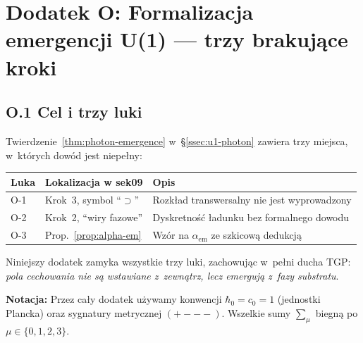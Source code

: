 %
%

\section*{Dodatek O: Formalizacja emergencji U(1) — trzy brakujące kroki}
\label{app:u1_formal}

\subsection*{O.1 Cel i trzy luki}

Twierdzenie~\ref{thm:photon-emergence} w~\S\ref{ssec:u1-photon}
zawiera trzy miejsca, w~których dowód jest niepełny:

\begin{center}
\begin{tabular}{lll}
\toprule
Luka & Lokalizacja w sek09 & Opis \\
\midrule
O-1 & Krok~3, symbol ``$\supset$'' & Rozkład transwersalny nie jest wyprowadzony \\
O-2 & Krok~2, ``wiry fazowe'' & Dyskretność ładunku bez formalnego dowodu \\
O-3 & Prop.~\ref{prop:alpha-em} & Wzór na $\alpha_\mathrm{em}$ ze szkicową dedukcją \\
\bottomrule
\end{tabular}
\end{center}

\noindent
Niniejszy dodatek zamyka wszystkie trzy luki, zachowując w~pełni
ducha TGP: \emph{pola cechowania nie są wstawiane z~zewnątrz,
lecz emergują z~fazy substratu}.

\medskip\noindent
\textbf{Notacja:} Przez cały dodatek używamy konwencji $\hbar_0 = c_0 = 1$
(jednostki Plancka) oraz sygnatury metrycznej $({+}{-}{-}{-})$.
Wszelkie sumy $\sum_\mu$ biegną po $\mu \in \{0,1,2,3\}$.

